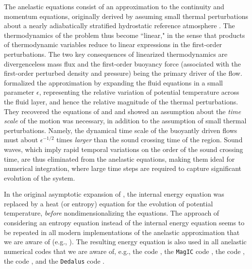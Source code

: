 \documentclass[12pt]{article}
\begin{document}
	The anelastic equations consist of an approximation to the continuity and momentum equations, originally derived by assuming small thermal perturbations about a nearly adiabatically stratified hydrostatic reference atmosphere \citep{Batchelor1953,Charney1960}. The thermodynamics of the problem thus become ``linear," in the sense that products of thermodynamic variables reduce to linear expressions in the first-order perturbations. The two key consequences of linearized thermodynamics are divergenceless mass flux and the first-order buoyancy force (associated with the first-order perturbed density and pressure) being the primary driver of the flow. \citet{Ogura1962} formalized the approximation by expanding the fluid equations in a small parameter $\epsilon$, representing the relative variation of potential temperature across the fluid layer, and hence the relative magnitude of the thermal perturbations. They recovered the equations of \citet{Batchelor1953} and \citet{Charney1960} and showed an assumption about the \textit{time scale} of the motion was necessary, in addition to the assumption of small thermal perturbations. Namely, the dynamical time scale of the buoyantly driven flows must about $\epsilon^{-1/2}$ times \textit{larger} than the sound crossing time of the region. Sound waves, which imply rapid temporal variations on the order of the sound crossing time, are thus eliminated from the anelastic equations, making them ideal for numerical integration, where large time steps are required to capture significant evolution of the system. 
	
	In the original asymptotic expansion of \citet{Ogura1962}, the internal energy equation was replaced by a heat (or entropy) equation for the evolution of potential temperature, \textit{before} nondimensionalizing the equations. The approach of considering an entropy equation instead of the internal energy equation seems to be repeated in all modern implementations of the anelastic approximation that we are aware of (e.g., \citealt{Gilman1981,Lipps1982,Glatzmaier1984,Lantz1992,Braginsky1995,Lantz1999,Clune1999,Rogers2005,Brown2012,Vasil2013,Wilczyski2022}). The resulting energy equation is also used in all anelastic numerical codes that we are aware of, e.g., the {\ash} code \citep{Brun2004}, the \texttt{MagIC} code \citep{Gastine2012}, the {\rayleigh} code \citep{Featherstone2016a,Featherstone2023}, the {\eulag} code \citep{Smolarkiewicz2004}, and the \texttt{Dedalus} code \citep{Burns2020,Brown2020}. 
	
\end{document}
